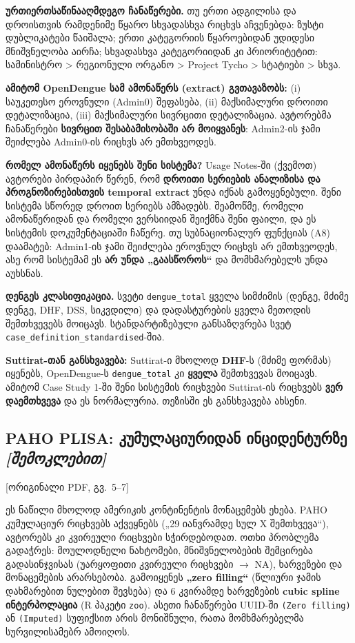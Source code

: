 \documentclass[11pt,a4paper]{article}
\newcommand{\imp}[1]{\textbf{\color{importred}#1}}
\newcommand{\pg}[1]{{\small\color{gray}[ორიგინალი PDF, გვ.~#1]}}
\begin{document}
\textbf{ურთიერთსაწინააღმდეგო ჩანაწერები.} თუ ერთი ადგილისა და დროისთვის რამდენიმე წყარო სხვადასხვა რიცხვს აჩვენებდა: ზუსტი
დუბლიკატები წაიშალა; ერთი კატეგორიის წყაროებიდან უდიდესი მნიშვნელობა აირჩა; სხვადასხვა კატეგორიიდან კი პრიორიტეტით:
სამინისტრო > რეგიონული ორგანო > Project Tycho > სტატიები > სხვა.

\imp{ამიტომ OpenDengue სამ ამონაწერს (extract) გვთავაზობს:} (i) საუკეთესო ეროვნული (Admin0) შეფასება, (ii) მაქსიმალური დროითი
დეტალიზაცია, (iii) მაქსიმალური სივრცითი დეტალიზაცია. ავტორებმა ჩანაწერები \imp{სივრცით შესაბამისობაში არ მოიყვანეს}: Admin2-ის
ჯამი შეიძლება Admin0-ის რიცხვს არ ემთხვეოდეს.

\begin{alarm}
\textbf{რომელ ამონაწერს იყენებს შენი სისტემა?} Usage Notes-ში (ქვემოთ) ავტორები პირდაპირ წერენ, რომ \imp{დროითი სერიების ანალიზისა და
პროგნოზირებისთვის \textbf{temporal extract}} უნდა იქნას გამოყენებული. შენი სისტემა სწორედ დროით სერიებს ამზადებს. შეამოწმე,
რომელი ამონაწერიდან და რომელი ვერსიიდან შეიქმნა შენი ფაილი, და ეს სისტემის დოკუმენტაციაში ჩაწერე. თუ სუბნაციონალურ ფუნქციას (A8)
დაამატებ: Admin1-ის ჯამი შეიძლება ეროვნულ რიცხვს არ ემთხვეოდეს, ასე რომ სისტემამ ეს \textbf{არ უნდა „გაასწოროს“} და
მომხმარებელს უნდა აუხსნას.
\end{alarm}

\textbf{დენგეს კლასიფიკაცია.} სვეტი \texttt{dengue\_total} ყველა სიმძიმის (დენგე, მძიმე დენგე, DHF, DSS, სიკვდილი) და დადასტურების
ყველა მეთოდის შემთხვევებს მოიცავს. სტანდარტიზებული განსაზღვრება სვეტ \texttt{case\_definition\_standardised}-შია.

\begin{etl}
\textbf{Suttirat-თან განსხვავება:} Suttirat-ი მხოლოდ \textbf{DHF}-ს (მძიმე ფორმას) იყენებს, OpenDengue-ს \texttt{dengue\_total} კი
\textbf{ყველა} შემთხვევას მოიცავს. ამიტომ Case Study 1-ში შენი სისტემის რიცხვები Suttirat-ის რიცხვებს \imp{ვერ დაემთხვევა} და ეს
ნორმალურია. თეზისში ეს განსხვავება ახსენი.
\end{etl}

\subsection*{PAHO PLISA: კუმულაციურიდან ინციდენტურზე \textit{[შემოკლებით]}} \pg{5--7}
\begin{skipbox}
ეს ნაწილი მხოლოდ ამერიკის კონტინენტის მონაცემებს ეხება. PAHO კუმულაციურ რიცხვებს აქვეყნებს („29 იანვრამდე სულ X შემთხვევა“),
ავტორებს კი კვირეული რიცხვები სჭირდებოდათ. ოთხი პრობლემა გადაჭრეს: მოულოდნელი ნახტომები, მნიშვნელობების შემცირება გადასინჯვისას
(უარყოფითი კვირეული რიცხვები $\rightarrow$ NA), ხარვეზები და მონაცემების არარსებობა. გამოიყენეს \textbf{„zero filling“} (წლიური ჯამის დახმარებით
ნულებით შევსება) და 6 კვირამდე ხარვეზების \textbf{cubic spline ინტერპოლაცია} (R პაკეტი \texttt{zoo}). ასეთი ჩანაწერები UUID-ში
\texttt{(Zero filling)} ან \texttt{(Imputed)} სუფიქსით არის მონიშნული, რათა მომხმარებელმა სურვილისამებრ ამოიღოს.
\end{skipbox}
\end{document}
